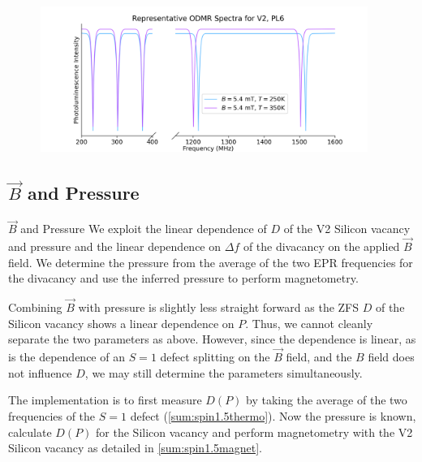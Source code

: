 \begin{figure}[h]
	\begin{center}
		\includegraphics[width=0.95\textwidth]{figures/ODMR-multimodal-s15magnet-s1T.png}
	\end{center}
	\caption{}\label{fig:multimode_BT}
\end{figure}


\subsection{$\vec{B}$ and Pressure}

\begin{proposal}{$\vec{B}$ and Pressure}
	We exploit the linear dependence of $D$ of the V2 Silicon vacancy and pressure and the linear dependence on $\Delta f$ of the divacancy on the applied $\vec{B}$ field. We determine the pressure from the average of the two EPR frequencies for the divacancy and use the inferred pressure to perform magnetometry. 

\end{proposal}
Combining $\vec{B}$ with pressure is slightly less straight forward as the ZFS $D$ of the Silicon vacancy shows a linear dependence on $P$. Thus, we cannot cleanly separate the two parameters as above. However, since the dependence is linear, as is the dependence of an $S=1$ defect splitting on the $\vec{B}$ field, and the $B$ field does not influence $D$, we may still determine the parameters simultaneously.

The implementation is to first measure $D(P)$ by taking the average of the two frequencies of the $S=1$ defect (\ref{sum:spin1.5thermo}). Now the pressure is known, calculate $D(P)$ for the Silicon vacancy and perform magnetometry with the V2 Silicon vacancy as detailed in \ref{sum:spin1.5magnet}.

